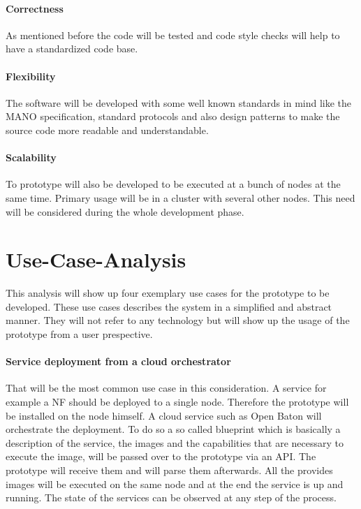\paragraph{Correctness} As mentioned before the code will be tested and code style checks will help to have a standardized code base.
\paragraph{Flexibility} The software will be developed with some well known standards in mind like the \ac{MANO} specification, standard protocols and also design patterns to make the source code more readable and understandable.
\paragraph{Scalability} To prototype will also be developed to be executed at a bunch of nodes at the same time.
Primary usage will be in a cluster with several other nodes.
This need will be considered during the whole development phase.


\section{Use-Case-Analysis}
\label{section:use-case-analysis}
This analysis will show up four exemplary use cases for the prototype to be developed.
These use cases describes the system in a simplified and abstract manner.
They will not refer to any technology but will show up the usage of the prototype from a user prespective.

\paragraph{Service deployment from a cloud orchestrator}
That will be the most common use case in this consideration.
A service for example a \ac{NF} should be deployed to a single node.
Therefore the prototype will be installed on the node himself.
A cloud service such as Open Baton will orchestrate the deployment.
To do so a so called blueprint which is basically a description of the service, the images and the capabilities that are necessary to execute the image, will be passed over to the prototype via an \ac{API}.
The prototype will receive them and will parse them afterwards.
All the provides images will be executed on the same node and at the end the service is up and running.
The state of the services can be observed at any step of the process.

